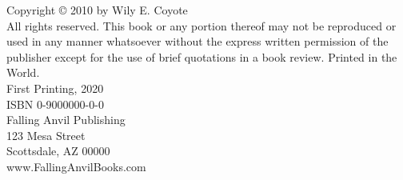 \clearpage
\thispagestyle{empty}
\vspace*{\fill}
{
	\footnotesize
	\raggedright
	Copyright © 2010 by Wily E. Coyote\\[2ex]
	
	All rights reserved. This book or any portion thereof
	may not be reproduced or used in any manner whatsoever
	without the express written permission of the publisher
	except for the use of brief quotations in a book review.
	Printed in the World.\\[2ex]
	
	First Printing, 2020\\[2ex]
	
	ISBN 0-9000000-0-0\\[2ex]
	
	Falling Anvil Publishing\\
	123 Mesa Street\\
	Scottsdale, AZ 00000\\[2ex]
	
	www.FallingAnvilBooks.com
}